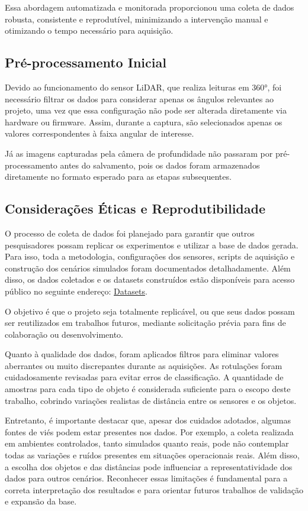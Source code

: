 Essa abordagem automatizada e monitorada proporcionou uma coleta de dados robusta, consistente e reprodutível, minimizando a intervenção manual e otimizando o tempo necessário para aquisição.

\subsection{Pré-processamento Inicial}

Devido ao funcionamento do sensor LiDAR, que realiza leituras em 360°, foi necessário filtrar os dados para considerar apenas os ângulos relevantes ao projeto, uma vez que essa configuração não pode ser alterada diretamente via hardware ou firmware. Assim, durante a captura, são selecionados apenas os valores correspondentes à faixa angular de interesse.

Já as imagens capturadas pela câmera de profundidade não passaram por pré-processamento antes do salvamento, pois os dados foram armazenados diretamente no formato esperado para as etapas subsequentes.

\subsection{Considerações Éticas e Reprodutibilidade}

O processo de coleta de dados foi planejado para garantir que outros pesquisadores possam replicar os experimentos e utilizar a base de dados gerada. Para isso, toda a metodologia, configurações dos sensores, scripts de aquisição e construção dos cenários simulados foram documentados detalhadamente. Além disso, os dados coletados e os datasets construídos estão disponíveis para acesso público no seguinte endereço: \href{https://drive.google.com/drive/folders/15SVMC3oxSVKuzv5S0CRKXIKJzF0k-9lz?usp=sharing}{Datasets}. 

O objetivo é que o projeto seja totalmente replicável, ou que seus dados possam ser reutilizados em trabalhos futuros, mediante solicitação prévia para fins de colaboração ou desenvolvimento.

Quanto à qualidade dos dados, foram aplicados filtros para eliminar valores aberrantes ou muito discrepantes durante as aquisições. As rotulações foram cuidadosamente revisadas para evitar erros de classificação. A quantidade de amostras para cada tipo de objeto é considerada suficiente para o escopo deste trabalho, cobrindo variações realistas de distância entre os sensores e os objetos.

Entretanto, é importante destacar que, apesar dos cuidados adotados, algumas fontes de viés podem estar presentes nos dados. Por exemplo, a coleta realizada em ambientes controlados, tanto simulados quanto reais, pode não contemplar todas as variações e ruídos presentes em situações operacionais reais. Além disso, a escolha dos objetos e das distâncias pode influenciar a representatividade dos dados para outros cenários. Reconhecer essas limitações é fundamental para a correta interpretação dos resultados e para orientar futuros trabalhos de validação e expansão da base.


